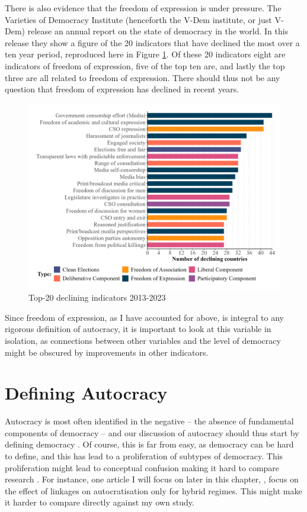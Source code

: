 There is also evidence that the freedom of expression is under pressure. The Varieties of Democracy Institute (henceforth the V-Dem institute, or just V-Dem) release an annual report on the state of democracy in the world. In this release they show a figure of the 20 indicators that have declined the most over a ten year period, reproduced here in Figure \ref{fig:declining}. Of these 20 indicators eight are indicators of freedom of expression, five of the top ten are, and lastly the top three are all related to freedom of expression. There should thus not be any question that freedom of expression has declined in recent years.

\begin{figure}[hbt!]
    \centering
    \includegraphics[width=\linewidth]{graphics/declining_indicators.jpeg}
    \caption{Top-20 declining indicators 2013-2023 \citep[p. 17]{nord_democracy_2025}}
    \label{fig:declining}
\end{figure}

Since freedom of expression, as I have accounted for above, is integral to any rigorous definition of autocracy, it is important to look at this variable in isolation, as connections between other variables and the level of democracy might be obscured by improvements in other indicators.

\section{Defining Autocracy}
Autocracy is most often identified in the negative -- the absence of fundamental components of democracy -- and our discussion of autocracy should thus start by defining democracy \citep{dahl_polyarchy_1971, przeworski_democracy_1991, schumpeter_capitalism_2010}. Of course, this is far from easy, as democracy can be hard to define, and this has lead to a proliferation of subtypes of democracy. This proliferation might lead to conceptual confusion making it hard to compare research \citep{collier_democracy_1997}. For instance, one article I will focus on later in this chapter, \citet{tansey_ties_2017}, focus on the effect of linkages on autocratisation only for hybrid regimes. This might make it harder to compare directly against my own study. 

